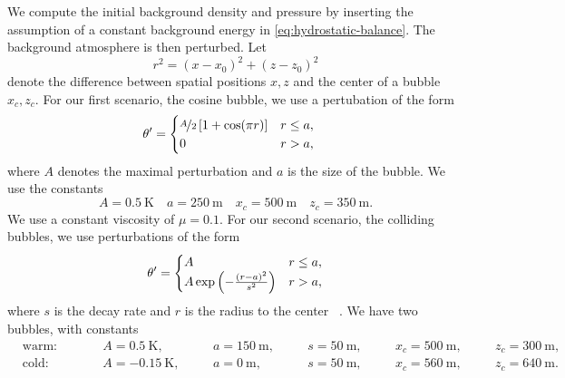 \documentclass[runningheads]{llncs}
\newcommand{\eqA}{}
\newcommand{\eqB}{(}
\newcommand{\eqMultiA}{(}
\newcommand{\eqMultiB}{)}
\DeclareRobustCommand{\pcrefSingle}[1]{%
\begingroup%
  \renewcommand{\eqA}{(}\renewcommand{\eqB}{}%
\cref{#1}%
\endgroup%
}
\DeclareRobustCommand{\pcrefMulti}[1]{%
\begingroup%
    \renewcommand{\eqMultiA}{}\renewcommand{\eqMultiB}{}%
    (\cref{#1})%
\endgroup%
}
\DeclareRobustCommand{\pcref}[1]{%
\IfSubStr{#1}{,}{\pcrefMulti{#1}}{\pcrefSingle{#1}}%
}
\begin{document}
We compute the initial background density and pressure by inserting the assumption of a constant background energy in \cref{eq:hydrostatic-balance}.
The background atmosphere is then perturbed.
Let
\begin{equation}
  \label{eq:radius}
  r^2 = (x - x_0)^2 + (z - z_0)^2
\end{equation}
denote the difference between spatial positions $x,z$ and the center of a bubble $x_c, z_c$.
For our first scenario, the cosine bubble, we use a pertubation of the form
\begin{align}
  \label{eq:cos-pertubation}
  \theta' &= \begin{cases}
    \nicefrac{A}{2} \left[ 1 + \cos(\pi r) \right] & r \leq a, \\
    0 & r > a,
    \end{cases}
\end{align}
where $A$ denotes the maximal perturbation and $a$ is the size of the bubble.
We use the constants
\begin{equation}\label{eq:cosine-bubble}
  A = \SI{0.5}{\K} \quad a = \SI{250}{\m} \quad x_c = \SI{500}{\m} \quad z_c = \SI{350}{\m}.
\end{equation}
We use a constant viscosity of $\mu = 0.1$.
For our second scenario, the colliding bubbles, we use perturbations of the form
\begin{equation}
  \label{eq:bubbles-pertubation}
  \theta' =
  \begin{cases}
    A & r \leq a, \\
    A \exp \left( - \frac{(r-a)^2}{s^2} \right) & r > a,
    \end{cases}
\end{equation}
where $s$ is the decay rate and $r$  is the radius to the center~\pcref{eq:radius}.
We have two bubbles, with constants
\begin{equation}
  \label{eq:bubbles-values}
\begin{alignedat}{6}
  & \text{warm:} \qquad && A = \SI{0.5}{\K}, \quad&& a = \SI{150}{\m}, \quad&& s = \SI{50}{\m}, \quad&& x_c = \SI{500}{\m,} \quad&& z_c = \SI{300}{\m},\\
  & \text{cold:} \qquad && A = \SI{-0.15}{\K}, \quad&& a = \SI{0}{\m}, \quad&& s = \SI{50}{\m}, \quad&& x_c = \SI{560}{\m}, \quad&& z_c = \SI{640}{\m}.
  \end{alignedat}
\end{equation}
\end{document}
